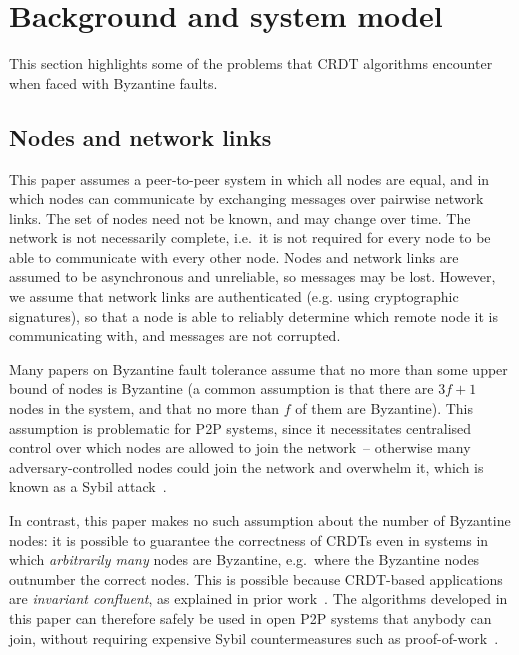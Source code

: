 \documentclass[sigplan,review]{acmart}
\begin{document}
\section{Background and system model}\label{sec:background}

This section highlights some of the problems that CRDT algorithms encounter when faced with Byzantine faults.

\subsection{Nodes and network links}\label{sec:system-model}

This paper assumes a peer-to-peer system in which all nodes are equal, and in which nodes can communicate by exchanging messages over pairwise network links.
The set of nodes need not be known, and may change over time.
The network is not necessarily complete, i.e.\ it is not required for every node to be able to communicate with every other node.
Nodes and network links are assumed to be asynchronous and unreliable, so messages may be lost.
However, we assume that network links are authenticated (e.g. using cryptographic signatures), so that a node is able to reliably determine which remote node it is communicating with, and messages are not corrupted.

Many papers on Byzantine fault tolerance assume that no more than some upper bound of nodes is Byzantine (a common assumption is that there are $3f+1$ nodes in the system, and that no more than $f$ of them are Byzantine).
This assumption is problematic for P2P systems, since it necessitates centralised control over which nodes are allowed to join the network~-- otherwise many adversary-controlled nodes could join the network and overwhelm it, which is known as a Sybil attack~\cite{Douceur:2002}.

In contrast, this paper makes no such assumption about the number of Byzantine nodes: it is possible to guarantee the correctness of CRDTs even in systems in which \emph{arbitrarily many} nodes are Byzantine, e.g.\ where the Byzantine nodes outnumber the correct nodes.
This is possible because CRDT-based applications are \emph{invariant confluent}, as explained in prior work~\cite{BECPreprint}.
The algorithms developed in this paper can therefore safely be used in open P2P systems that anybody can join, without requiring expensive Sybil countermeasures such as proof-of-work~\cite{Nakamoto:2008}.
\end{document}
